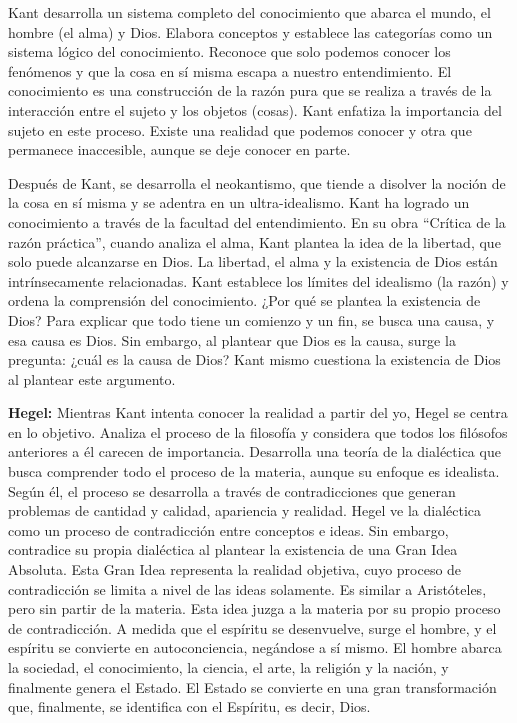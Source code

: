 \documentclass[
  a4paper,
]{article}
\begin{document}
Kant desarrolla un sistema completo del conocimiento que abarca el
mundo, el hombre (el alma) y Dios. Elabora conceptos y establece las
categorías como un sistema lógico del conocimiento. Reconoce que solo
podemos conocer los fenómenos y que la cosa en sí misma escapa a nuestro
entendimiento. El conocimiento es una construcción de la razón pura que
se realiza a través de la interacción entre el sujeto y los objetos
(cosas). Kant enfatiza la importancia del sujeto en este proceso. Existe
una realidad que podemos conocer y otra que permanece inaccesible,
aunque se deje conocer en parte.

Después de Kant, se desarrolla el neokantismo, que tiende a disolver la
noción de la cosa en sí misma y se adentra en un ultra-idealismo. Kant
ha logrado un conocimiento a través de la facultad del entendimiento. En
su obra ``Crítica de la razón práctica'', cuando analiza el alma, Kant
plantea la idea de la libertad, que solo puede alcanzarse en Dios. La
libertad, el alma y la existencia de Dios están intrínsecamente
relacionadas. Kant establece los límites del idealismo (la razón) y
ordena la comprensión del conocimiento. ¿Por qué se plantea la
existencia de Dios? Para explicar que todo tiene un comienzo y un fin,
se busca una causa, y esa causa es Dios. Sin embargo, al plantear que
Dios es la causa, surge la pregunta: ¿cuál es la causa de Dios? Kant
mismo cuestiona la existencia de Dios al plantear este argumento.

\textbf{Hegel:} Mientras Kant intenta conocer la realidad a partir del
yo, Hegel se centra en lo objetivo. Analiza el proceso de la filosofía y
considera que todos los filósofos anteriores a él carecen de
importancia. Desarrolla una teoría de la dialéctica que busca comprender
todo el proceso de la materia, aunque su enfoque es idealista. Según él,
el proceso se desarrolla a través de contradicciones que generan
problemas de cantidad y calidad, apariencia y realidad. Hegel ve la
dialéctica como un proceso de contradicción entre conceptos e ideas. Sin
embargo, contradice su propia dialéctica al plantear la existencia de
una Gran Idea Absoluta. Esta Gran Idea representa la realidad objetiva,
cuyo proceso de contradicción se limita a nivel de las ideas solamente.
Es similar a Aristóteles, pero sin partir de la materia. Esta idea juzga
a la materia por su propio proceso de contradicción. A medida que el
espíritu se desenvuelve, surge el hombre, y el espíritu se convierte en
autoconciencia, negándose a sí mismo. El hombre abarca la sociedad, el
conocimiento, la ciencia, el arte, la religión y la nación, y finalmente
genera el Estado. El Estado se convierte en una gran transformación que,
finalmente, se identifica con el Espíritu, es decir, Dios.
\end{document}
